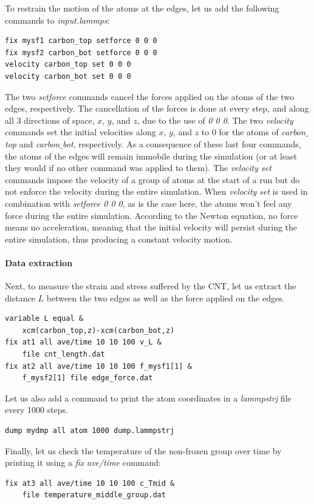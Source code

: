 \documentclass[9pt,tutorial]{livecoms}
\begin{document}
To restrain the motion of the atoms at the edges, let us add the following commands to \textit{input.lammps}:
{\normalsize \begin{verbatim}
fix mysf1 carbon_top setforce 0 0 0
fix mysf2 carbon_bot setforce 0 0 0
velocity carbon_top set 0 0 0
velocity carbon_bot set 0 0 0
\end{verbatim}}
The two \textit{setforce} commands cancel the forces applied on the atoms of the two edges, respectively. The cancellation of the forces
is done at every step, and along all 3 directions of space, $x$, $y$, and $z$, due to the use of \textit{0 0 0}. The two \textit{velocity} commands set the initial velocities along $x$, $y$, and $z$ to 0 for the atoms of \textit{carbon$\_$top} and \textit{carbon$\_$bot}, respectively. As a consequence of these last four commands, the atoms of the edges will remain immobile during the simulation (or at least they would if no other command was applied to them). The \textit{velocity set} commands impose the velocity of a group of atoms at the start of a run but do not enforce the velocity during the entire simulation. When \textit{velocity set} is used in combination with \textit{setforce 0 0 0}, as is the case here, the atoms won't feel any force during the entire simulation. According to the Newton equation, no force means no acceleration, meaning that the initial velocity will persist during the entire simulation, thus producing a constant velocity motion.

\paragraph{Data extraction}
Next, to measure the strain and stress suffered by the CNT, let us extract the distance $L$ between the two edges as well as the force applied on the edges.
{\normalsize \begin{verbatim}
variable L equal &
    xcm(carbon_top,z)-xcm(carbon_bot,z)
fix at1 all ave/time 10 10 100 v_L &
    file cnt_length.dat
fix at2 all ave/time 10 10 100 f_mysf1[1] &
    f_mysf2[1] file edge_force.dat
\end{verbatim}}
\noindent Let us also add a command to print the atom coordinates in a \textit{lammpstrj} file every 1000 steps.
{\normalsize \begin{verbatim}
dump mydmp all atom 1000 dump.lammpstrj
\end{verbatim}}
\noindent Finally, let us check the temperature of the non-frozen group over time by printing it using a \textit{fix ave/time} command:
{\normalsize \begin{verbatim}
fix at3 all ave/time 10 10 100 c_Tmid &
    file temperature_middle_group.dat
\end{verbatim}}
\end{document}

